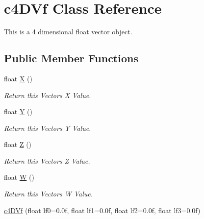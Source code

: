 \hypertarget{classc4_d_vf}{
\section{c4DVf Class Reference}
\label{classc4_d_vf}
}


This is a 4 dimensional float vector object.  


\subsection*{Public Member Functions}
\begin{DoxyCompactItemize}
\item 
\hypertarget{classc4_d_vf_af818515652ebbfb14cb1a3bf9f58a3b8}{
float \hyperlink{classc4_d_vf_af818515652ebbfb14cb1a3bf9f58a3b8}{X} ()}
\label{classc4_d_vf_af818515652ebbfb14cb1a3bf9f58a3b8}

\begin{DoxyCompactList}\small\item\em Return this Vectors X Value. \end{DoxyCompactList}\item 
\hypertarget{classc4_d_vf_a49f22b2bce20263643156f1c614031f8}{
float \hyperlink{classc4_d_vf_a49f22b2bce20263643156f1c614031f8}{Y} ()}
\label{classc4_d_vf_a49f22b2bce20263643156f1c614031f8}

\begin{DoxyCompactList}\small\item\em Return this Vectors Y Value. \end{DoxyCompactList}\item 
\hypertarget{classc4_d_vf_af5308464238f0bca5beb827b66449d16}{
float \hyperlink{classc4_d_vf_af5308464238f0bca5beb827b66449d16}{Z} ()}
\label{classc4_d_vf_af5308464238f0bca5beb827b66449d16}

\begin{DoxyCompactList}\small\item\em Return this Vectors Z Value. \end{DoxyCompactList}\item 
\hypertarget{classc4_d_vf_a7b9a67a9d17417de2e0e7b35fb0aa66e}{
float \hyperlink{classc4_d_vf_a7b9a67a9d17417de2e0e7b35fb0aa66e}{W} ()}
\label{classc4_d_vf_a7b9a67a9d17417de2e0e7b35fb0aa66e}

\begin{DoxyCompactList}\small\item\em Return this Vectors W Value. \end{DoxyCompactList}\item 
\hypertarget{classc4_d_vf_a6fdca704f25fb60e25fabd8de00c0927}{
\hyperlink{classc4_d_vf_a6fdca704f25fb60e25fabd8de00c0927}{c4DVf} (float lf0=0.0f, float lf1=0.0f, float lf2=0.0f, float lf3=0.0f)}
\label{classc4_d_vf_a6fdca704f25fb60e25fabd8de00c0927}


\end{DoxyCompactItemize}
